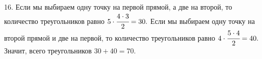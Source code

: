 16. Если мы выбираем одну точку на первой прямой, а две на второй, то количество треугольников равно $5\cdot\cfrac{4\cdot3}{2}=30.$ Если мы выбираем одну точку на второй прямой и две на первой, то количество треугольников равно $4\cdot\cfrac{5\cdot4}{2}=40.$ Значит, всего треугольников $30+40=70.$\\
